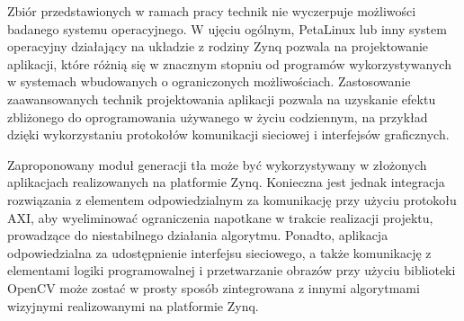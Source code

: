 Zbiór przedstawionych w ramach pracy technik nie wyczerpuje możliwości badanego systemu operacyjnego. 
W ujęciu ogólnym, PetaLinux lub inny system operacyjny działający na układzie z rodziny Zynq pozwala na projektowanie aplikacji, które różnią się w znacznym stopniu od programów wykorzystywanych w systemach wbudowanych o ograniczonych możliwościach. 
Zastosowanie zaawansowanych technik projektowania aplikacji pozwala na uzyskanie efektu zbliżonego do oprogramowania używanego w życiu codziennym, na przykład dzięki wykorzystaniu protokołów komunikacji sieciowej i interfejsów graficznych.

Zaproponowany moduł generacji tła może być wykorzystywany w złożonych aplikacjach realizowanych na platformie Zynq. Konieczna jest jednak integracja rozwiązania z elementem odpowiedzialnym za komunikację przy użyciu protokołu AXI, aby wyeliminować ograniczenia napotkane w trakcie realizacji projektu, prowadzące do niestabilnego działania algorytmu. 
Ponadto, aplikacja odpowiedzialna za udostępnienie interfejsu sieciowego, a także komunikację z elementami logiki programowalnej i przetwarzanie obrazów przy użyciu biblioteki OpenCV może zostać w prosty sposób zintegrowana z innymi algorytmami wizyjnymi realizowanymi na platformie Zynq.


